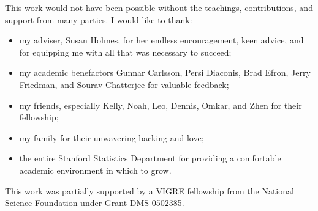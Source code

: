 
This work would not have been possible without the teachings,
contributions, and support from many parties.  I would like to thank:
\begin{itemize}
    \item my adviser, Susan Holmes, for her endless encouragement, keen advice,
      and for equipping me with all that was necessary to succeed;
    \item my academic benefactors Gunnar Carlsson, Persi Diaconis, Brad Efron, Jerry Friedman,
      and Sourav Chatterjee for valuable feedback;
    \item my friends, especially Kelly, Noah, Leo, Dennis, Omkar, and
      Zhen for their fellowship;
    \item my family for their unwavering backing and love;
    \item the entire Stanford Statistics Department for providing a
      comfortable academic environment in which to grow.
\end{itemize}
This work was partially supported by a VIGRE fellowship from the
National Science Foundation under Grant DMS-0502385.